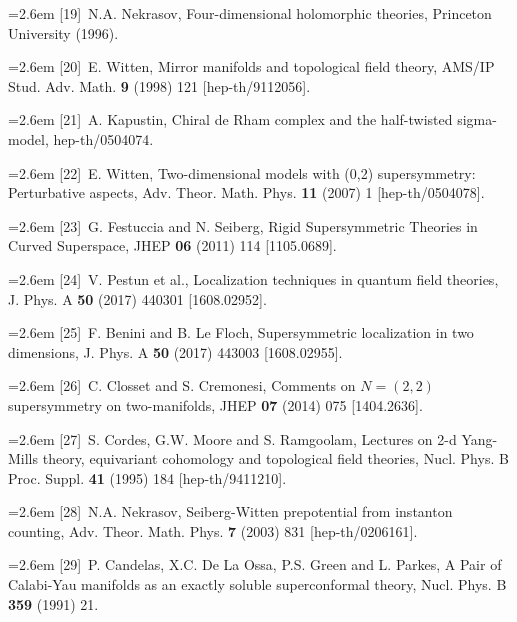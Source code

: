 \par\noindent\hangindent=2.6em [19]~N.A. Nekrasov, Four-dimensional holomorphic theories, Princeton University (1996).

\par\noindent\hangindent=2.6em [20]~E. Witten, Mirror manifolds and topological field theory, AMS/IP Stud. Adv. Math. \textbf{9} (1998) 121 [hep-th/9112056].

\par\noindent\hangindent=2.6em [21]~A. Kapustin, Chiral de Rham complex and the half-twisted sigma-model, hep-th/0504074.

\par\noindent\hangindent=2.6em [22]~E. Witten, Two-dimensional models with (0,2) supersymmetry: Perturbative aspects, Adv. Theor. Math. Phys. \textbf{11} (2007) 1 [hep-th/0504078].

\par\noindent\hangindent=2.6em [23]~G. Festuccia and N. Seiberg, Rigid Supersymmetric Theories in Curved Superspace, JHEP \textbf{06} (2011) 114 [1105.0689].

\par\noindent\hangindent=2.6em [24]~V. Pestun et al., Localization techniques in quantum field theories, J. Phys. A \textbf{50} (2017) 440301 [1608.02952].

\par\noindent\hangindent=2.6em [25]~F. Benini and B. Le Floch, Supersymmetric localization in two dimensions, J. Phys. A \textbf{50} (2017) 443003 [1608.02955].

\par\noindent\hangindent=2.6em [26]~C. Closset and S. Cremonesi, Comments on $N=(2,2)$ supersymmetry on two-manifolds, JHEP \textbf{07} (2014) 075 [1404.2636].

\par\noindent\hangindent=2.6em [27]~S. Cordes, G.W. Moore and S. Ramgoolam, Lectures on 2-d Yang-Mills theory, equivariant cohomology and topological field theories, Nucl. Phys. B Proc. Suppl. \textbf{41} (1995) 184 [hep-th/9411210].

\par\noindent\hangindent=2.6em [28]~N.A. Nekrasov, Seiberg-Witten prepotential from instanton counting, Adv. Theor. Math. Phys. \textbf{7} (2003) 831 [hep-th/0206161].

\par\noindent\hangindent=2.6em [29]~P. Candelas, X.C. De La Ossa, P.S. Green and L. Parkes, A Pair of Calabi-Yau manifolds as an exactly soluble superconformal theory, Nucl. Phys. B \textbf{359} (1991) 21.

